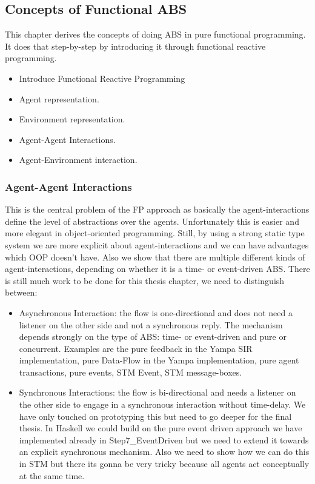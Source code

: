 \subsection{Concepts of Functional ABS}
This chapter derives the concepts of doing ABS in pure functional programming. It does that step-by-step by introducing it through functional reactive programming.

\begin{itemize}
	\item Introduce Functional Reactive Programming
	\item Agent representation.
	\item Environment representation.
	\item Agent-Agent Interactions.
	\item Agent-Environment interaction.
\end{itemize}

\subsubsection{Agent-Agent Interactions}
This is the central problem of the FP approach as basically the agent-interactions define the level of abstractions over the agents. Unfortunately this is easier and more elegant in object-oriented programming. Still, by using a strong static type system we are more explicit about agent-interactions and we can have advantages which OOP doesn't have. Also we show that there are multiple different kinds of agent-interactions, depending on whether it is a time- or event-driven ABS.
There is still much work to be done for this thesis chapter, we need to distinguish between:

\begin{itemize}
	\item Asynchronous Interaction: the flow is one-directional and does not need a listener on the other side and not a synchronous reply. The mechanism depends strongly on the type of ABS: time- or event-driven and pure or concurrent. Examples are the pure feedback in the Yampa SIR implementation, pure Data-Flow in the Yampa implementation, pure agent transactions, pure events, STM Event, STM message-boxes.
	\item Synchronous Interactions: the flow is bi-directional and needs a listener on the other side to engage in a synchronous interaction without time-delay. We have only touched on prototyping this but need to go deeper for the final thesis. In Haskell we could build on the pure event driven approach we have implemented already in Step7\_EventDriven but we need to extend it towards an explicit synchronous mechanism. Also we need to show how we can do this in STM but there its gonna be very tricky because all agents act conceptually at the same time.
\end{itemize}

